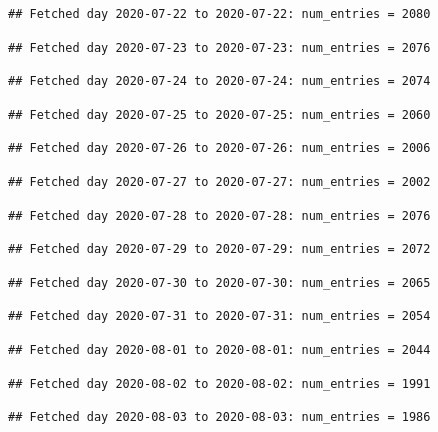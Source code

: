 \documentclass[]{article}
\begin{document}
\begin{verbatim}
## Fetched day 2020-07-22 to 2020-07-22: num_entries = 2080
\end{verbatim}

\begin{verbatim}
## Fetched day 2020-07-23 to 2020-07-23: num_entries = 2076
\end{verbatim}

\begin{verbatim}
## Fetched day 2020-07-24 to 2020-07-24: num_entries = 2074
\end{verbatim}

\begin{verbatim}
## Fetched day 2020-07-25 to 2020-07-25: num_entries = 2060
\end{verbatim}

\begin{verbatim}
## Fetched day 2020-07-26 to 2020-07-26: num_entries = 2006
\end{verbatim}

\begin{verbatim}
## Fetched day 2020-07-27 to 2020-07-27: num_entries = 2002
\end{verbatim}

\begin{verbatim}
## Fetched day 2020-07-28 to 2020-07-28: num_entries = 2076
\end{verbatim}

\begin{verbatim}
## Fetched day 2020-07-29 to 2020-07-29: num_entries = 2072
\end{verbatim}

\begin{verbatim}
## Fetched day 2020-07-30 to 2020-07-30: num_entries = 2065
\end{verbatim}

\begin{verbatim}
## Fetched day 2020-07-31 to 2020-07-31: num_entries = 2054
\end{verbatim}

\begin{verbatim}
## Fetched day 2020-08-01 to 2020-08-01: num_entries = 2044
\end{verbatim}

\begin{verbatim}
## Fetched day 2020-08-02 to 2020-08-02: num_entries = 1991
\end{verbatim}

\begin{verbatim}
## Fetched day 2020-08-03 to 2020-08-03: num_entries = 1986
\end{verbatim}
\end{document}
